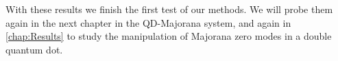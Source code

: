 With these results we finish the first test of our methods. We will probe them again in the next chapter in the QD-Majorana system, and again in \ref{chap:Results} to study the manipulation of  Majorana zero modes in a double quantum dot. 








